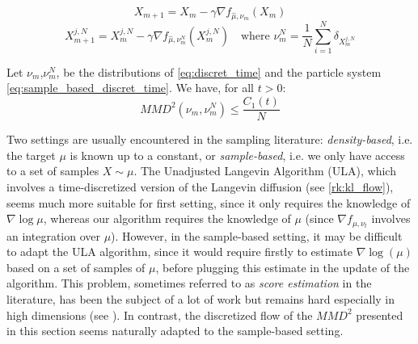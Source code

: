 \begin{equation}\label{eq:discret_time}
X_{m+1}=X_m - \gamma \nabla f_{\widehat{\mu}, \nu_m}(X_m) \end{equation}
\begin{equation}\label{eq:sample_based_discret_time}
X_{m+1}^{j,N}=X_{m}^{j,N}- \gamma \nabla f_{\widehat{\mu}, \nu_m^N}(X_m^{j,N}) \quad \text{where } \nu_m^N=\frac{1}{N} \sum_{i=1}^N \delta_{X_m^{j,N}}
\end{equation}
\begin{proposition}%
	Let $\nu_m$,$\nu_m^N$, be the distributions of \eqref{eq:discret_time} and the particle system \eqref{eq:sample_based_discret_time}. We have, for all $t>0$:
	\begin{equation}
	MMD^2(\nu_m,\nu_m^N)\le \frac{C_1(t)}{N}
	\end{equation}
\end{proposition}

\begin{remark}
	Two settings are usually encountered in the sampling literature: \textit{density-based}, i.e. the target $\mu$ is known up to a constant, or \textit{sample-based}, i.e. we only have access to a set of samples $X \sim \mu$.
	The Unadjusted Langevin Algorithm (ULA), which involves a time-discretized version of the Langevin diffusion (see \cref{rk:kl_flow}), seems much more suitable for first setting, since it only requires the knowledge of $\nabla \log \mu$, whereas our algorithm requires the knowledge of $\mu$ (since $\nabla f_{\mu, \nu_t}$ involves an integration over $\mu$). However, in the sample-based setting, it may be difficult to adapt the ULA algorithm, since it would require firstly to estimate $\nabla \log(\mu)$ based on a set of samples of $\mu$, before plugging this estimate in the update of the algorithm. This problem, sometimes referred to as \textit{score estimation} in the literature, has been the subject of a lot of work but remains hard especially in high dimensions (see \cite{sutherland2017efficient,li2018gradient,shi2018spectral}). In contrast, the discretized flow of the $MMD^2$ presented in this section seems naturally adapted to the sample-based setting.
\end{remark}
 








